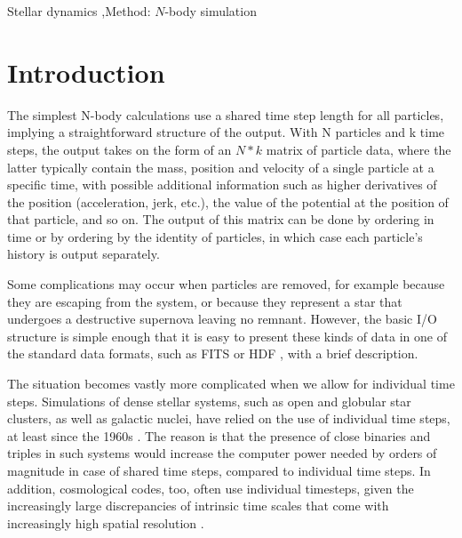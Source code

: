 \documentclass[5p,authoryear]{elsarticle}
\begin{document}
\begin{keyword}
  Stellar dynamics \sep Method: $N$-body simulation
\end{keyword}

\maketitle

\section{Introduction}

The simplest N-body calculations use a shared time step length for all
particles, implying a straightforward structure of the output.  With
N particles and k time steps, the output takes on the form of an $N*k$
matrix of particle data, where the latter typically contain the mass,
position and velocity of a single particle at a specific time, with
possible additional information such as higher derivatives of the
position (acceleration, jerk, etc.), the value of the potential at the
position of that particle, and so on.  The output of this matrix can
be done by ordering in time or by ordering by the identity of
particles, in which case each particle's history is output separately.

Some complications may occur when particles are removed, for example
because they are escaping from the system, or because they represent a
star that undergoes a destructive supernova leaving no remnant.
However, the basic I/O structure is simple enough that it is easy to
present these kinds of data in one of the standard data formats, such
as FITS \citep{Pence2010} or HDF \citep{HDF2011}, with a brief
description.

The situation becomes vastly more complicated when we allow for
individual time steps.  Simulations of dense stellar systems, such as
open and globular star clusters, as well as galactic nuclei, have
relied on the use of individual time steps, at least since the 1960s
\citep{Aarseth2009}.  The reason is that the presence of close
binaries and triples in such systems would increase the computer power
needed by orders of magnitude in case of shared time steps, compared
to individual time steps.  In addition, cosmological codes, too, often
use individual timesteps, given the increasingly large discrepancies
of intrinsic time scales that come with increasingly high spatial
resolution \citep[e.g.][]{Springel2005}.
\end{document}
